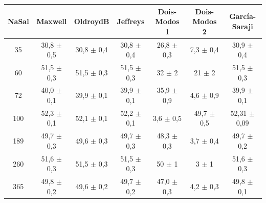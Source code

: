 		\begin{table}[h]
	{%
		\begin{tabular}{c | c c c c c c}
			\toprule
			NaSal & Maxwell             & OldroydB             & Jeffreys             & Dois-Modos 1            & Dois-Modos 2            & García-Saraji      \\ \midrule
			 35   & 30,8    \(\pm\) 0,5 & 30,8     \(\pm\) 0,4 & 30,8     \(\pm\) 0,4 & 26,8        \(\pm\) 0,3 & 7,3         \(\pm\) 0,4 & 30,9  \(\pm\) 0,4  \\
			 60   & 51,5    \(\pm\) 0,3 & 51,5     \(\pm\) 0,3 & 51,5     \(\pm\) 0,3 & 32          \(\pm\) 2   & 21          \(\pm\) 2   & 51,5  \(\pm\) 0,3  \\
			 72   & 40,0    \(\pm\) 0,1 & 39,9     \(\pm\) 0,1 & 39,9     \(\pm\) 0,1 & 35,9        \(\pm\) 0,9 & 4,6         \(\pm\) 0,9 & 39,9  \(\pm\) 0,1  \\
			 100  & 52,3    \(\pm\) 0,1 & 52,1     \(\pm\) 0,1 & 52,2     \(\pm\) 0,1 & 3,6         \(\pm\) 0,5 & 49,7        \(\pm\) 0,5 & 52,31 \(\pm\) 0,09 \\
			 189  & 49,7    \(\pm\) 0,3 & 49,6     \(\pm\) 0,3 & 49,7     \(\pm\) 0,3 & 48,3        \(\pm\) 0,3 & 3,7         \(\pm\) 0,4 & 49,7  \(\pm\) 0,2  \\
			 260  & 51,6    \(\pm\) 0,3 & 51,5     \(\pm\) 0,3 & 51,5     \(\pm\) 0,3 & 50          \(\pm\) 1   & 3           \(\pm\) 1   & 51,6  \(\pm\) 0,3  \\
			 365  & 49,8    \(\pm\) 0,2 & 49,6     \(\pm\) 0,2 & 49,7     \(\pm\) 0,2 & 47,0        \(\pm\) 0,3 & 4,2         \(\pm\) 0,3 & 49,8  \(\pm\) 0,1  \\ \bottomrule
		\end{tabular}
	}{}
\end{table}  
	
